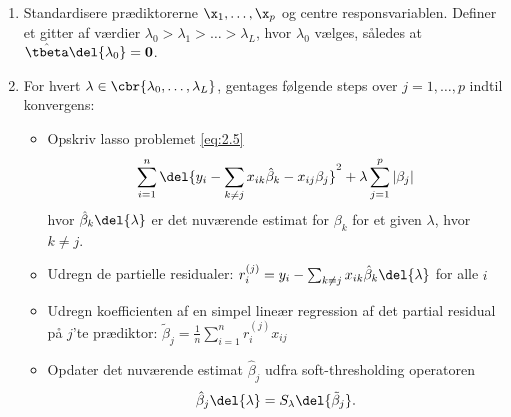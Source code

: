 %
\begin{alg} 
\begin{enumerate}
\item Standardisere prædiktorerne \(\x_1, \ldots, \x_p\) og centre responsvariablen.
Definer et gitter af værdier \(\lambda_0 > \lambda_1 > \ldots > \lambda_L\), hvor \(\lambda_0\) vælges, således at \(\hat{\tbeta} \del{\lambda_0} =\mathbf{0}\).
\item For hvert \(\lambda \in \cbr{\lambda_0, \ldots, \lambda_L}\), gentages følgende steps over \(j = 1, \ldots, p\) indtil konvergens:
\begin{itemize}
\item Opskriv lasso problemet \eqref{eq:2.5}
\begin{align*}
\sum_{i=1}^n \del{y_i - \sum_{k \neq j} x_{ik} \hat{\beta}_k - x_{ij} \beta_j}^2 + \lambda \sum_{j = 1}^p \vert \beta_j \vert
\end{align*}
hvor \(\hat{\beta}_k \del{\lambda}\) er det nuværende estimat for \(\beta_k\) for et given \(\lambda\), hvor \(k \neq j\).
\item Udregn de partielle residualer: \(r_{i}^{(j)} = y_i - \sum_{k \neq j} x_{ik} \hat{\beta}_k \del{\lambda}\) for alle \(i\)
\item Udregn koefficienten af en simpel lineær regression af det partial residual på \(j\)'te prædiktor: \(\tilde{\beta}_j = \frac{1}{n} \sum_{i=1}^n r_{i}^{(j)} x_{ij}\) 
\item Opdater det nuværende estimat \(\hat{\beta}_j\) udfra soft-thresholding operatoren
\begin{align}
\hat{\beta}_j \del{\lambda}= S_\lambda \del{\tilde{\beta}_j}. \label{eq:update_coordinate}
\end{align}
\end{itemize}
\end{enumerate}
\end{alg}
